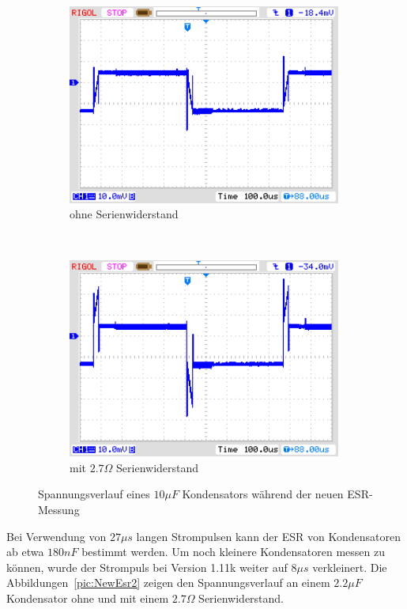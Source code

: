 \begin{figure}[H]
  \begin{subfigure}[b]{9cm}
    \centering
    \includegraphics[width=9cm]{../PNG/NewEsr10uF0R0.png}
    \caption{ohne Serienwiderstand}
  \end{subfigure}
  ~
  \begin{subfigure}[b]{9cm}
    \centering
    \includegraphics[width=9cm]{../PNG/NewEsr10uF2R7.png}
    \caption{mit \(2.7\Omega\) Serienwiderstand}
  \end{subfigure}
  \caption{Spannungsverlauf eines \(10\mu F\) Kondensators während der neuen ESR-Messung}
  \label{pic:NewEsr10}
\end{figure}

Bei Verwendung von \(27 \mu s\) langen Strompulsen kann der ESR von Kondensatoren ab etwa \(180 nF\) bestimmt werden.
Um noch kleinere Kondensatoren messen zu können, wurde der Strompuls bei Version 1.11k weiter auf \(8 \mu s\) verkleinert.
Die Abbildungen~\ref{pic:NewEsr2} zeigen den Spannungsverlauf an einem \(2.2 \mu F\) Kondensator ohne und mit
einem \(2.7 \Omega\) Serienwiderstand.

